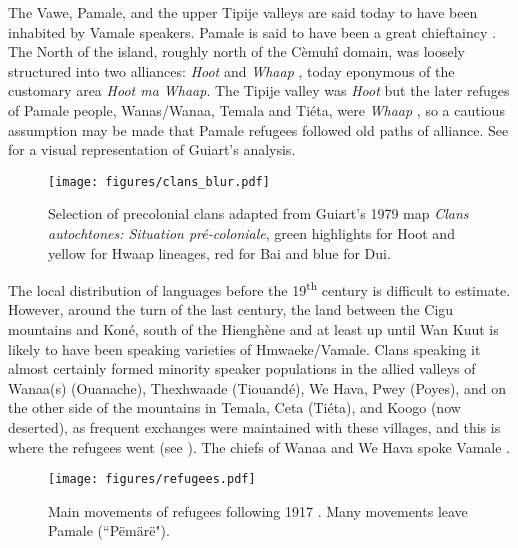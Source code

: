 The Vawe, Pamale, and the upper Tipije valleys are said today to have been inhabited by Vamale speakers. Pamale is said to have been a great chieftaincy \parencite[59]{gohoup_guerre_2008}. The North of the island, roughly north of the Cèmuhî domain, was loosely structured into two alliances: \textit{Hoot}  and \textit{Whaap} , today eponymous of the customary area \textit{Hoot ma Whaap}. The Tipije valley was \textit{Hoot} but the later refuges of Pamale people, Wanas/Wanaa, Temala and Tiéta, were \textit{Whaap} \parencite[6]{guiart_lorganisation_1954}, so a cautious assumption may be made that Pamale refugees followed old paths of alliance. See  for a visual representation of Guiart's analysis. %

\begin{figure}
\texttt{[image: figures/clans\_blur.pdf]}
\caption{Selection of precolonial clans adapted from Guiart's 1979 map \textit{Clans autochtones: Situation pré-coloniale}, %
green highlights for Hoot and yellow for Hwaap lineages, red for Bai and blue for Dui. \parencite[71]{guiart_clans_1981}}
\label{map:clans}
\end{figure}

The local distribution of languages before the 19\textsuperscript{th} century is difficult to estimate. However, around the turn of the last century, the land between the Cigu mountains and Koné, south of the Hienghène and at least up until Wan Kuut is likely to have been speaking varieties of Hmwaeke/Vamale. Clans speaking it almost certainly formed minority speaker populations in the allied valleys of Wanaa(s) (Ouanache), Thexhwaade (Tiouandé), We Hava, Pwey (Poyes), and on the other side of the mountains in Temala, Ceta (Tiéta), and Koogo (now deserted), as frequent exchanges were maintained with these villages, and this is where the refugees went (see ). The chiefs of Wanaa and We Hava spoke Vamale \parencite[20]{leenhardt_evenements_1978a}.
\begin{figure}
	\texttt{[image: figures/refugees.pdf]}
	\caption{Main movements of refugees following 1917 \parencite[7]{bensa_1917_2008}. Many movements leave Pamale (``Pëmärë").}
	\label{map:fugitives}
\end{figure}

